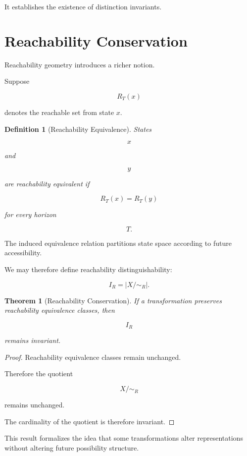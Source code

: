 \documentclass[11pt,oneside,openany]{book}
\newtheorem{definition}{Definition}[chapter] \newtheorem{theorem}{Theorem}[chapter] \newtheorem{proposition}{Proposition}[chapter] \newtheorem{lemma}{Lemma}[chapter] \newtheorem{corollary}{Corollary}[chapter] \newtheorem{remark}{Remark}[chapter]
\begin{document}
It establishes the existence of distinction invariants.

\section{Reachability Conservation}

Reachability geometry introduces a richer notion.

Suppose

\[
R_T(x)
\]

denotes the reachable set from state \(x\).

\begin{definition}[Reachability Equivalence]

States

\[
x
\]

and

\[
y
\]

are reachability equivalent if

\[
R_T(x)
=
R_T(y)
\]

for every horizon

\[
T.
\]

\end{definition}

The induced equivalence relation partitions state space according to future accessibility.

We may therefore define reachability distinguishability:

\[
I_R
=
\left|
X/\!\sim_R
\right|.
\]

\begin{theorem}[Reachability Conservation]

If a transformation preserves reachability equivalence classes, then

\[
I_R
\]

remains invariant.

\end{theorem}

\begin{proof}

Reachability equivalence classes remain unchanged.

Therefore the quotient

\[
X/\!\sim_R
\]

remains unchanged.

The cardinality of the quotient is therefore invariant.

\end{proof}

This result formalizes the idea that some transformations alter representations without altering future possibility structure.
\end{document}
